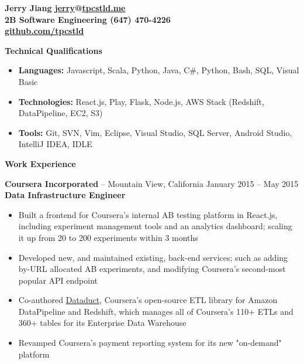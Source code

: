 \documentclass{letter}
\begin{document}
  \thispagestyle{empty}


{\bfseries
  {\Large Jerry Jiang} \hfill \href{mailto:jerry@tpcstld.me}{jerry}@\href{//tpcstld.me}{tpcstld.me} \\
  2B Software Engineering \hfill (647) 470-4226 \\
  \null \hfill \href{https://github.com/tpcstld}{github.com/tpcstld}} \\
\null \hrulefill

{\bfseries \Large Technical Qualifications}
\vspace{-3mm}
\begin{itemize}
    \item {\bfseries Languages:}
        Javascript, Scala, Python, Java, C\#, Python, Bash, SQL, Visual Basic
    \item {\bfseries Technologies:}
        React.js, Play, Flask, Node.js, AWS Stack (Redshift, DataPipeline, EC2, S3)
    \item {\bfseries Tools:}
        Git, SVN, Vim, Eclipse, Visual Studio, SQL Server, Android Studio, IntelliJ IDEA, IDLE
\end{itemize}

{\bfseries \Large Work Experience}

\vspace{-1.5mm}
{\bfseries Coursera Incorporated} -- Mountain View, California \hfill January 2015 -- May 2015 \\
{\bfseries Data Infrastructure Engineer}
\vspace{-3mm}
\begin{itemize}
    \item Built a frontend for Coursera's internal AB testing platform in React.js, including
      experiment management tools and an analytics dashboard; scaling it up from 20 to
      200 experiments within 3 months
    \item Developed new, and maintained existing, back-end services; such as adding by-URL allocated
      AB experiments, and modifying Coursera's second-most popular API endpoint
    \item Co-authored \href{https://github.com/coursera/dataduct}{Dataduct},
      Coursera's open-source ETL library for Amazon DataPipeline and
      Redshift, which manages all of Coursera's 110+ ETLs and 360+ tables for its Enterprise Data Warehouse
    \item Revamped Coursera's payment reporting system for its new "on-demand" platform
\end{itemize}
\end{document}
